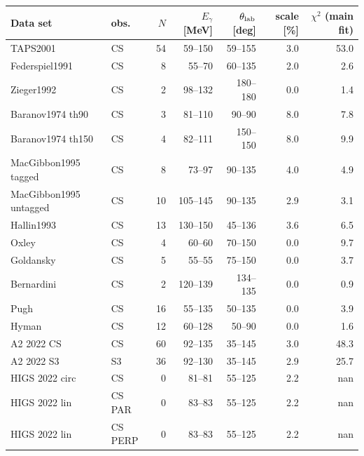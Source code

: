 \begin{tabular}{llrrrrr}
\hline
Data set & obs. & $N$ & $E_\gamma$ [MeV] & $\theta_{\rm lab}$ [deg] & scale [\%] & $\chi^2$ (main fit)\\\hline
TAPS2001 \cite{OlmosdeLeon:2001zn} & CS & 54 & 59--150 & 59--155 & 3.0 & 53.0\\
Federspiel1991 \cite{Federspiel:1991yd} & CS & 8 & 55--70 & 60--135 & 2.0 & 2.6\\
Zieger1992 \cite{Zieger:1992jq} & CS & 2 & 98--132 & 180--180 & 0.0 & 1.4\\
Baranov1974 th90 \cite{Baranov:1974ec} & CS & 3 & 81--110 & 90--90 & 8.0 & 7.8\\
Baranov1974 th150 \cite{Baranov:1974ec} & CS & 4 & 82--111 & 150--150 & 8.0 & 9.9\\
MacGibbon1995 tagged \cite{MacGibbon:1995in} & CS & 8 & 73--97 & 90--135 & 4.0 & 4.9\\
MacGibbon1995 untagged \cite{MacGibbon:1995in} & CS & 10 & 105--145 & 90--135 & 2.9 & 3.1\\
Hallin1993 \cite{Hallin:1993ft} & CS & 13 & 130--150 & 45--136 & 3.6 & 6.5\\
Oxley \cite{Oxley:1958zz} & CS & 4 & 60--60 & 70--150 & 0.0 & 9.7\\
Goldansky \cite{Goldansky:1960zz} & CS & 5 & 55--55 & 75--150 & 0.0 & 3.7\\
Bernardini \cite{Bernardini:1960wya} & CS & 2 & 120--139 & 134--135 & 0.0 & 0.9\\
Pugh \cite{Pugh:1957zz} & CS & 16 & 55--135 & 50--135 & 0.0 & 3.9\\
Hyman \cite{Hyman:1959zz} & CS & 12 & 60--128 & 50--90 & 0.0 & 1.6\\
A2 2022 CS \cite{A2:2021wmm} & CS & 60 & 92--135 & 35--145 & 3.0 & 48.3\\
A2 2022 S3 \cite{A2:2021wmm} & S3 & 36 & 92--130 & 35--145 & 2.9 & 25.7\\
HIGS 2022 circ \cite{Li:2022vnz} & CS & 0 & 81--81 & 55--125 & 2.2 & nan\\
HIGS 2022 lin \cite{Li:2022vnz} & CS PAR & 0 & 83--83 & 55--125 & 2.2 & nan\\
HIGS 2022 lin \cite{Li:2022vnz} & CS PERP & 0 & 83--83 & 55--125 & 2.2 & nan\\
\hline
\end{tabular}

